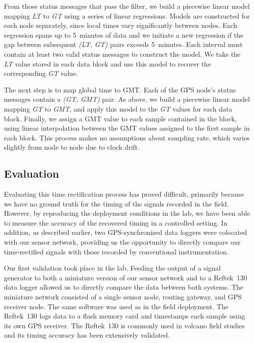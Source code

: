 From those status messages that pass the filter, we build a piecewise linear
model mapping {\em LT} to {\em GT} using a series of linear regressions.
Models are constructed for each node separately, since local times vary
significantly between nodes.  Each regression spans up to 5~minutes of data
and we initiate a new regression if the gap between subsequent {\em (LT, GT)}
pairs exceeds 5~minutes.  Each interval must contain at least two valid
status messages to construct the model.  We take the {\em LT} value stored in
each data block and use this model to recover the corresponding {\em GT}
value.

The next step is to map global time to GMT. Each of the GPS node's status
messages contain a {\em (GT, GMT)} pair. As above, we build a piecewise
linear model mapping {\em GT} to {\em GMT}, and apply this model to the {\em
GT} values for each data block. Finally, we assign a GMT value to each sample
contained in the block, using linear interpolation between the GMT values
assigned to the first sample in each block.  This process makes no
assumptions about sampling rate, which varies slightly from node to node due
to clock drift.

\subsection{Evaluation}
\label{evaluation-timing-postdeployment}

Evaluating this time rectification process has proved difficult, primarily
because we have no ground truth for the timing of the signals recorded in the
field. However, by reproducing the deployment conditions in the lab, we have
been able to measure the accuracy of the recovered timing in a controlled
setting. In addition, as described earlier, two GPS-synchronized data loggers
were colocated with our sensor network, providing us the opportunity to
directly compare our time-rectified signals with those recorded by
conventional instrumentation.

Our first validation took place in the lab. Feeding the output of a signal
generator to both a miniature version of our sensor network and to a
Reftek~130 data logger allowed us to directly compare the data between both
systems. The miniature network consisted of a single sensor node, routing
gateway, and GPS receiver node. The same software was used as in the field
deployment. The Reftek~130 logs data to a flash memory card and timestamps
each sample using its own GPS receiver. The Reftek~130 is commonly used in
volcano field studies and its timing accuracy has been extensively validated.

